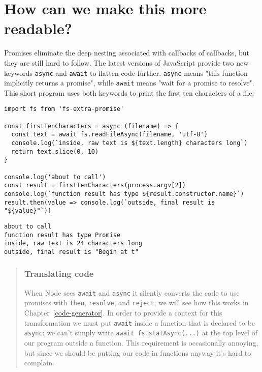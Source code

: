 \documentclass[krantzl]{krantz}
\newcommand{\chapref}[1]{Chapter~\ref{#1}}
\newenvironment{callout}{\savenotes\begin{tBox}\begin{quotation}\toggletrue{inbox}\renewcommand{\thempfootnote}{\arabic{footnote}}}{\end{quotation}\vspace{\baselineskip}\end{tBox}\togglefalse{inbox}\spewnotes}
\begin{document}
\section{How can we make this more readable?}\label{async-programming-readable}


Promises eliminate the deep nesting associated with callbacks of callbacks,
but they are still hard to follow.
The latest versions of JavaScript provide two new keywords \texttt{async} and \texttt{await}
to flatten code further.
\texttt{async} means "this function implicitly returns a promise",
while \texttt{await} means "wait for a promise to resolve".
This short program uses both keywords to print the first ten characters of a file:


\begin{lstlisting}[frame=single,frameround=tttt]
import fs from 'fs-extra-promise'

const firstTenCharacters = async (filename) => {
  const text = await fs.readFileAsync(filename, 'utf-8')
  console.log(`inside, raw text is ${text.length} characters long`)
  return text.slice(0, 10)
}

console.log('about to call')
const result = firstTenCharacters(process.argv[2])
console.log(`function result has type ${result.constructor.name}`)
result.then(value => console.log(`outside, final result is "${value}"`))
\end{lstlisting}



\begin{lstlisting}[frame=single,frameround=tttt]
about to call
function result has type Promise
inside, raw text is 24 characters long
outside, final result is "Begin at t"
\end{lstlisting}


\begin{callout}


\subsubsection*{Translating code}


When Node sees \texttt{await} and \texttt{async}
it silently converts the code to use promises with \texttt{then}, \texttt{resolve}, and \texttt{reject};
we will see how this works in \chapref{code-generator}.
In order to provide a context for this transformation
we must put \texttt{await} inside a function that is declared to be \texttt{async}:
we can't simply write \texttt{await fs.statAsync(...)} at the top level of our program
outside a function.
This requirement is occasionally annoying,
but since we should be putting our code in functions anyway
it's hard to complain.

\end{callout}
\end{document}
